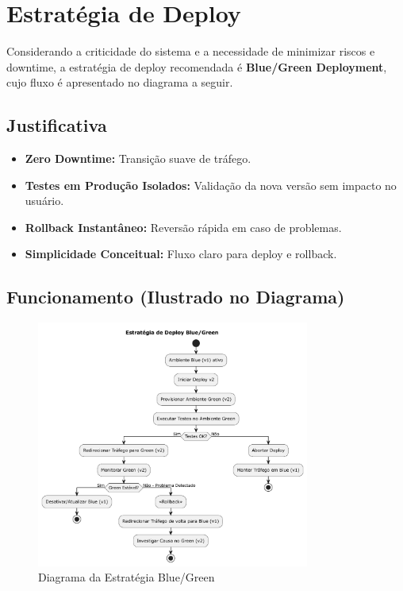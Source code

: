 \section{Estratégia de Deploy}
\label{sec:estrategia-deploy}

Considerando a criticidade do sistema e a necessidade de minimizar riscos e downtime, a estratégia de deploy recomendada é \textbf{Blue/Green Deployment}, cujo fluxo é apresentado no diagrama a seguir.

\subsection{Justificativa}
\label{subsec:deploy-justificativa}
\begin{itemize}
    \item \textbf{Zero Downtime:} Transição suave de tráfego.
    \item \textbf{Testes em Produção Isolados:} Validação da nova versão sem impacto no usuário.
    \item \textbf{Rollback Instantâneo:} Reversão rápida em caso de problemas.
    \item \textbf{Simplicidade Conceitual:} Fluxo claro para deploy e rollback.
\end{itemize}

\subsection{Funcionamento (Ilustrado no Diagrama)}
\label{subsec:deploy-funcionamento}

\begin{figure}[htbp]
    \centering
    \includegraphics[width=0.8\textwidth]{assets/diagrama-bluegreen.pdf}
    \caption{Diagrama da Estratégia Blue/Green}
    \label{fig:diagrama-bluegreen}
\end{figure}

